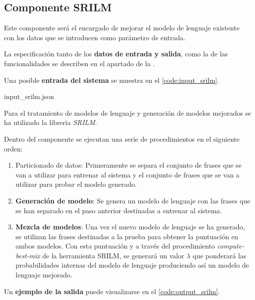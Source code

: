 \documentclass[../main.tex]{subfiles}
\begin{document}


\subsection{Componente SRILM}\label{subsec:impl_srilm}

Este componente será el encargado de mejorar el modelo de lenguaje existente con los datos que se introducen como parámetro de entrada.

La especificación tanto de los \textbf{datos de entrada y salida}, como la de las funcionalidades se describen en el apartado  de la .

Una posible \textbf{entrada del sistema} se muestra en el \autoref{code:input_srilm}.

                {input_srilm.json}
                
Para el tratamiento de modelos de lenguaje y generación de modelos mejorados se ha utilizado la libreria \textit{SRILM}.

Dentro del componente se ejecutan una serie de procedimientos en el siguiente orden:
\begin{enumerate}
    \item Particionado de datos: Primeramente se separa el conjunto de frases que se van a utilizar para entrenar al sistema y el conjunto de frases que se van a utilizar para probar el modelo generado.
    \item \textbf{Generación de modelo}: Se genera un modelo de lenguaje con las frases que se han separado en el paso anterior destinadas a entrenar al sistema.
    \item \textbf{Mezcla de modelos}: Una vez el nuevo modelo de lenguaje se ha generado, se utilizan las frases destinadas a la prueba para obtener la puntuación en ambos modelos. Con esta puntuación y a través del procedimiento \textit{compute-best-mix} de la herramienta SRILM, se generará un valor \( \lambda \) que ponderará las probabilidades internas del modelo de lenguaje produciendo así un modelo de lenguaje mejorado.
\end{enumerate}

Un \textbf{ejemplo de la salida} puede visualizarse en el \autoref{code:output_srilm}.
\end{document}
